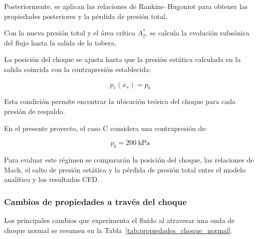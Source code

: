 \documentclass[12pt,letterpaper]{article}
\numberwithin{equation}{section}
\begin{document}
Posteriormente, se aplican las
relaciones de Rankine--Hugoniot
para obtener las propiedades
posteriores y la pérdida de
presión total.

Con la nueva presión total y el
área crítica $A_2^*$, se calcula
la evolución subsónica del flujo
hasta la salida de la tobera.

La posición del choque se ajusta
hasta que la presión estática
calculada en la salida coincida
con la contrapresión establecida:

\begin{equation}
    p_e(x_s)=p_b
\end{equation}

Esta condición permite encontrar
la ubicación teórica del choque
para cada presión de respaldo.

En el presente proyecto, el caso C
considera una contrapresión de:

\begin{equation}
    p_b=200\ \mathrm{kPa}
\end{equation}

Para evaluar este régimen se
compararán la posición del choque,
las relaciones de Mach, el salto
de presión estática y la pérdida
de presión total entre el modelo
analítico y los resultados CFD.


\subsubsection{Cambios de propiedades
a través del choque}

Los principales cambios que experimenta
el fluido al atravesar una onda de
choque normal se resumen en la
Tabla~\ref{tab:propiedades_choque_normal}.
\end{document}
